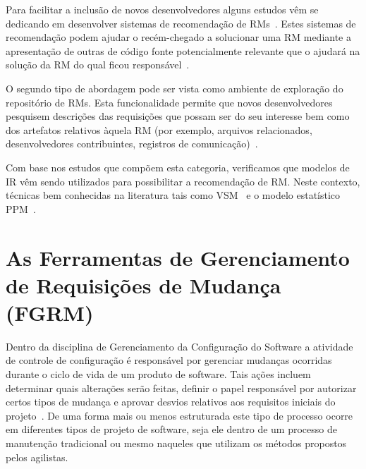 Para facilitar a inclusão de novos desenvolvedores alguns estudos vêm se
dedicando em desenvolver sistemas de recomendação de
RMs~\cite{malheiros2012source, Wang2011bug}. Estes sistemas de recomendação
podem ajudar o recém-chegado a solucionar uma RM mediante a apresentação de
outras de código fonte potencialmente relevante que o ajudará na solução da RM
do qual ficou responsável~\cite{malheiros2012source}.

O segundo tipo de abordagem pode ser vista como ambiente de exploração do
repositório de RMs.  Esta funcionalidade permite que novos desenvolvedores
pesquisem descrições das requisições que possam ser do seu interesse bem como
dos artefatos relativos àquela RM (por exemplo, arquivos relacionados,
desenvolvedores contribuintes, registros de comunicação)~\cite{Wang2011bug}.

Com base nos estudos que compõem esta categoria, verificamos que modelos de IR
vêm sendo utilizados para possibilitar a recomendação de RM\@. Neste contexto,
técnicas bem conhecidas na literatura tais como VSM~\cite{Wang2011bug} e o
modelo estatístico PPM~\cite{malheiros2012source}.
\section{As Ferramentas de Gerenciamento de Requisições de Mudança (FGRM)}
\label{sec:ferramentas_de_gerenciamento_requisicoes_de_mudanca}

Dentro da disciplina de Gerenciamento da Configuração do Software a atividade de
controle de configuração é responsável por gerenciar mudanças ocorridas durante
o ciclo de vida de um produto de software. Tais ações incluem determinar quais
alterações serão feitas, definir o papel responsável por autorizar certos tipos
de mudança e aprovar desvios relativos aos requisitos iniciais do
projeto~\cite{4425813}. De uma forma mais ou menos estruturada este tipo de
processo ocorre em diferentes tipos de projeto de software, seja ele dentro de
um processo de manutenção tradicional ou mesmo naqueles que utilizam os métodos
propostos pelos agilistas.

